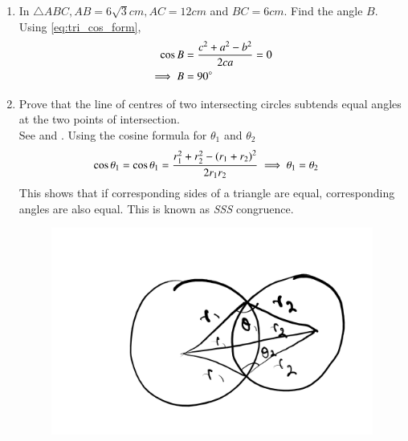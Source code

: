 \begin{enumerate}[label=\thesubsection.\arabic*.,ref=\thesubsection.\theenumi]
\item  In  $\triangle  ABC, AB = 6\sqrt{3} cm, AC = 12 cm$ and $BC = 6 cm$. Find the angle $B$.
	\\
	\solution Using 
\eqref{eq:tri_cos_form},
\begin{align}
	\cos B &= 
 \frac{c^2+a^2-b^2}{2ca}=0
	\\
	\implies B &= 90\degree
\end{align}
\item Prove that the line of centres of two intersecting circles subtends equal angles at the
two points of intersection.
	\\
		\solution 
		See 
 and
.
Using the cosine formula for $\theta_1$ and $\theta_2$	
\begin{align}
	\cos \theta_1 =\cos \theta_1  =\frac{r_1^2+r_2^2 - \left(r_1+r_2\right)^2}{2r_1r_2}	
	\implies \theta_1 &= \theta_2 
\end{align}
		This shows that if corresponding sides of a triangle are equal, corresponding angles are also equal.  This is known as {\em SSS} congruence.
\begin{table}[H]
\centering

\caption{}
\label{tab:ncert-sss}	
\end{table}
\begin{figure}[H]
	\begin{center}
		{\includegraphics[width=0.6\columnwidth]{figs/ncert/triangle/sss.png}}
	\end{center}
	\caption{}
	\label{fig:ncert-sss}	
\end{figure}
%
\end{enumerate}

